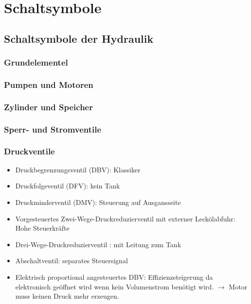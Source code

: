 \section{Schaltsymbole}
\subsection{Schaltsymbole der Hydraulik}
\subsubsection{Grundelementel}
\subsubsection{Pumpen und Motoren}
\subsubsection{Zylinder und Speicher}
\subsubsection{Sperr- und Stromventile}
\subsubsection{Druckventile}
\begin{itemize}
\item Druckbegrenzungsventil (DBV): Klassiker
\item Druckfolgeventil (DFV):  kein Tank 
\item Druckminderventil (DMV):  Steuerung auf Ausgansseite
\item Vorgesteuertes Zwei-Wege-Druckreduzierventil mit externer Leckölabfuhr:  Hohe Steuerkräfte
\item Drei-Wege-Druckreduzierventil : mit Leitung zum Tank
\item Abschaltventil: separates Steuersignal 
\item Elektrisch proportional angesteuertes DBV: Effizienzsteigerung da elektronisch geöffnet wird wenn kein  Volumenstrom benötigt wird. $\to$ Motor muss keinen Druck mehr erzeugen.
\end{itemize}

